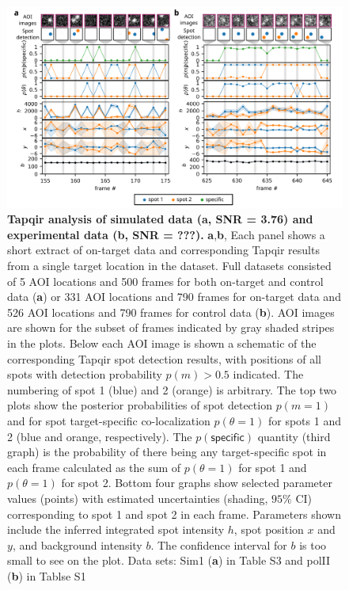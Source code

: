 \begin{figure}[t]
\centering
\includegraphics[width=183mm]{figures/figure3/figure3.png}
\caption{\textbf{Tapqir analysis of simulated data (\textbf{a}, SNR = 3.76) and experimental data (\textbf{b}, SNR = ???).} \textbf{a},\textbf{b}, Each panel shows a short extract of on-target data and corresponding Tapqir results from a single target location in the dataset. Full datasets consisted of 5 AOI locations and 500 frames for both on-target and control data (\textbf{a}) or 331 AOI locations and 790 frames for on-target data and 526 AOI locations and 790 frames for control data (\textbf{b}). AOI images are shown for the subset of frames indicated by gray shaded stripes in the plots. Below each AOI image is shown a schematic of the corresponding Tapqir spot detection results, with positions of all spots with detection probability $p(m) > 0.5$ indicated. The numbering of spot 1 (blue) and 2 (orange) is arbitrary. The top two plots show the posterior probabilities of spot detection $p(m=1)$ and for spot target-specific co-localization $p(\theta=1)$ for spots 1 and 2 (blue and orange, respectively). The  $p(\mathsf{specific})$ quantity (third graph) is the probability of there being any target-specific spot in each frame calculated as the sum of $p(\theta=1)$ for spot 1 and $p(\theta=1)$ for spot 2.  Bottom four graphs show selected parameter values (points) with estimated uncertainties (shading, $95\%$ CI) corresponding to spot 1 and spot 2  in each frame. Parameters shown include the inferred integrated spot intensity $h$, spot position $x$ and $y$, and background intensity $b$. The confidence interval for $b$ is too small to see on the plot. Data sets: Sim1 (\textbf{a}) in Table S3 and polII (\textbf{b}) in Tablse S1 }
\label{fig:tapqir_analysis}
\end{figure}



